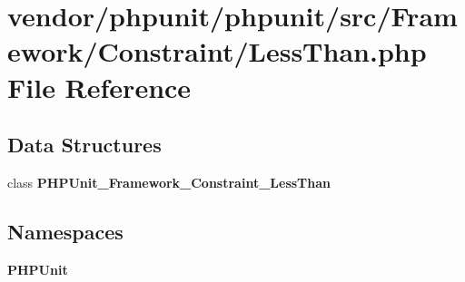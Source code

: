 \section{vendor/phpunit/phpunit/src/\+Framework/\+Constraint/\+Less\+Than.php File Reference}
\label{_less_than_8php}
\subsection*{Data Structures}
\begin{DoxyCompactItemize}
\item 
class {\bf P\+H\+P\+Unit\+\_\+\+Framework\+\_\+\+Constraint\+\_\+\+Less\+Than}
\end{DoxyCompactItemize}
\subsection*{Namespaces}
\begin{DoxyCompactItemize}
\item 
 {\bf P\+H\+P\+Unit}
\end{DoxyCompactItemize}
